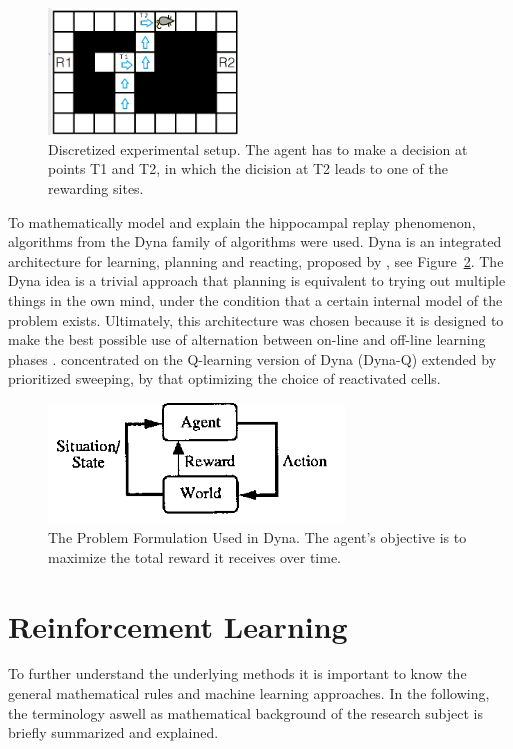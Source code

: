 \documentclass[a4paper]{article}
\begin{document}
	\begin{figure}[t]
		\centering
		\includegraphics[angle=0,width=0.45\textwidth]{./figs/setup.png}
		\caption{\label{fig:setup}Discretized experimental setup. The agent has to make a decision at points T1 and T2, in which the dicision at T2 leads to one of the rewarding sites. \citep{NeuralDynaQ}}
	\end{figure}
	
	\par To mathematically model and explain the hippocampal replay phenomenon, algorithms from the Dyna family of algorithms were used. Dyna is an integrated architecture for learning, planning and reacting, proposed by \cite{Dyna}, see Figure~\ref{fig:dyna}. The Dyna idea is a trivial approach that planning is equivalent to trying out multiple things in the own mind, under the condition that a certain internal model of the problem exists. Ultimately, this architecture was chosen because it is designed to make the best possible use of alternation between on-line and off-line learning phases \citep{Dyna}. \cite{NeuralDynaQ} concentrated on the Q-learning version of Dyna (Dyna-Q) extended by prioritized sweeping, by that optimizing the choice of reactivated cells.
	
	
	\begin{figure}[b]
		\centering
		\includegraphics[angle=0,width=0.7\textwidth]{./figs/Dyna-Figure1.png}
		\caption{\label{fig:dyna}The Problem Formulation Used in Dyna. The agent's objective is to maximize the total reward it receives over time. \citep{Dyna}}
	\end{figure}
	\newpage
	\section{Reinforcement Learning}
	To further understand the underlying methods it is important to know the general mathematical rules and machine learning approaches. In the following, the terminology aswell as mathematical background of the research subject is briefly summarized and explained. 
	
\end{document}
